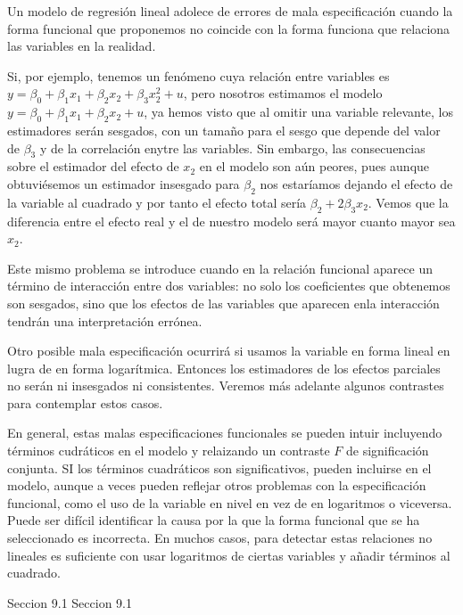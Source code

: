 
Un modelo de regresi\'on lineal adolece de errores de mala especificaci\'on cuando la forma funcional que proponemos no coincide con la forma funciona que relaciona las variables en la realidad.

Si, por ejemplo, tenemos un fen\'omeno cuya relaci\'on entre variables es $y=\beta_0+\beta_1x_1+\beta_2x_2+\beta_3x_2^2+u$, pero nosotros estimamos el modelo $y=\beta_0+\beta_1x_1+\beta_2x_2+u$, ya hemos visto que al omitir una variable relevante, los estimadores ser\'an sesgados, con un tama\~no para el sesgo que depende del valor de $\beta_3$ y de la correlaci\'on enytre las variables. Sin embargo, las consecuencias sobre el estimador del efecto de $x_2$ en el modelo son a\'un peores, pues aunque obtuvi\'esemos un estimador insesgado para $\beta_2$ nos estar\'iamos dejando el efecto de la variable al cuadrado y por tanto el efecto total ser\'ia $\beta_2+2\beta_3x_2$. Vemos que la diferencia entre el efecto real y el de nuestro modelo ser\'a mayor cuanto mayor sea $x_2$.

Este mismo problema se introduce cuando en la relaci\'on funcional aparece un t\'ermino de interacci\'on entre dos variables: no solo los coeficientes que obtenemos son sesgados, sino que los efectos de las variables que aparecen enla interacci\'on tendr\'an una interpretaci\'on err\'onea.

Otro posible mala especificaci\'on ocurrir\'a si usamos la variable en forma lineal en lugra de en forma logar\'itmica. Entonces los estimadores de los efectos parciales no ser\'an ni insesgados ni consistentes. Veremos m\'as adelante algunos contrastes para contemplar estos casos.

En general, estas malas especificaciones funcionales se pueden intuir incluyendo t\'erminos cudr\'aticos en el modelo y relaizando un contraste $F$ de significaci\'on conjunta. SI los t\'erminos cuadr\'aticos son significativos, pueden incluirse en el modelo, aunque a veces pueden reflejar otros problemas con la especificaci\'on funcional, como el uso de la variable en nivel en vez de en logaritmos o viceversa. Puede ser dif\'icil identificar la causa por la que la forma funcional que se ha seleccionado es incorrecta. En muchos casos, para detectar estas relaciones no lineales es suficiente con usar logaritmos de ciertas variables y a\~nadir t\'erminos al cuadrado.

Seccion 9.1
Seccion 9.1